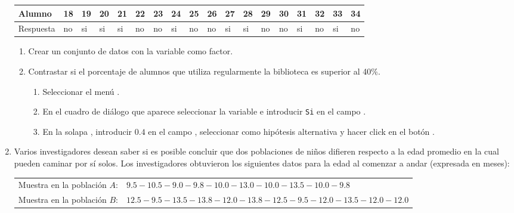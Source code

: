 \begin{enumerate}[leftmargin=*]
\begin{flushleft}
\begin{tabular}{|l|l|l|l|l|l|l|l|l|l|l|l|l|l|l|l|l|l|}
\hline
Alumno & 18 & 19 & 20 & 21 & 22 & 23 & 24 & 25 & 26 & 27 & 28 & 29 & 30 & 31 & 32 & 33 & 34 \\
\hline
Respuesta & no & si & si & si & no & no & si & no & no & si & si & no & no & si & no & si & no \\
\hline
\end{tabular}
\end{flushleft}

\begin{enumerate}
\item Crear un conjunto de datos con la variable  como factor.

\item Contrastar si el porcentaje de alumnos que utiliza regularmente la biblioteca es superior al 40\%. 
\begin{indicacion}
\begin{enumerate}
\item Seleccionar el menú .
\item En el cuadro de diálogo que aparece seleccionar la variable  e introducir \texttt{Si} en el campo .
\item En la solapa , introducir $0.4$ en el campo , seleccionar como
hipótesis alternativa  y hacer click en el botón .
\end{enumerate}
\end{indicacion}
\end{enumerate}

\item Varios investigadores desean saber si es posible concluir que dos poblaciones de niños difieren respecto a la edad
promedio en la cual pueden caminar por sí solos.
Los investigadores obtuvieron los siguientes datos para la edad al comenzar a andar (expresada en meses):
\begin{center}
\begin{tabular}{ll}
Muestra en la población $A$: & $9.5-10.5-9.0-9.8-10.0-13.0-10.0-13.5-10.0-9.8$\\
Muestra en la población $B$: & $12.5-9.5-13.5-13.8-12.0-13.8-12.5-9.5-12.0-13.5-12.0-12.0$
\end{tabular}
\end{center}


\end{enumerate}
